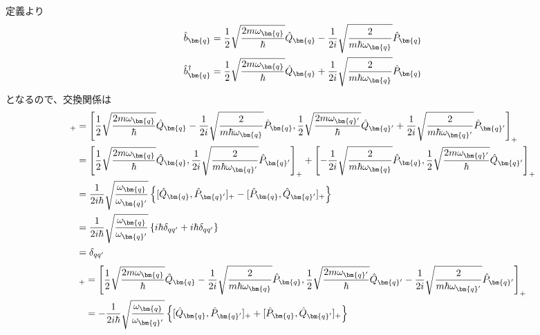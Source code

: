 \documentclass[dvipdfmx, 11pt, a4paper]{jsarticle}
\numberwithin{equation}{section}
\theoremstyle{definition}
\begin{document}
    \begin{derivationBox}
        定義より
        \begin{align}
            \hat{b}_{\bm{q}} &= \frac{1}{2}\sqrt{\frac{2m\omega_{\bm{q}}}{\hbar}} \hat{Q}_{\bm{q}} - \frac{1}{2i}\sqrt{\frac{2}{m\hbar\omega_{\bm{q}}}} \hat{P}_{\bm{q}} \notag \\
            \hat{b}_{\bm{q}}^\dagger &= \frac{1}{2}\sqrt{\frac{2m\omega_{\bm{q}}}{\hbar}} \hat{Q}_{\bm{q}} + \frac{1}{2i}\sqrt{\frac{2}{m\hbar\omega_{\bm{q}}}} \hat{P}_{\bm{q}}
        \end{align}
        となるので、交換関係は
        \begin{align}
            [\hat{b}_{\bm{q}},\hat{b}_{\bm{q}'}^\dagger]_+ &= \left[ \frac{1}{2}\sqrt{\frac{2m\omega_{\bm{q}}}{\hbar}} \hat{Q}_{\bm{q}} - \frac{1}{2i}\sqrt{\frac{2}{m\hbar\omega_{\bm{q}}}} \hat{P}_{\bm{q}}, \frac{1}{2}\sqrt{\frac{2m\omega_{\bm{q}'}}{\hbar}} \hat{Q}_{\bm{q}'} + \frac{1}{2i}\sqrt{\frac{2}{m\hbar\omega_{\bm{q}'}}} \hat{P}_{\bm{q}'} \right]_+ \notag \\
            &= \left[ \frac{1}{2}\sqrt{\frac{2m\omega_{\bm{q}}}{\hbar}} \hat{Q}_{\bm{q}} ,  \frac{1}{2i}\sqrt{\frac{2}{m\hbar\omega_{\bm{q}'}}} \hat{P}_{\bm{q}'} \right]_+ + \left[ - \frac{1}{2i}\sqrt{\frac{2}{m\hbar\omega_{\bm{q}}}} \hat{P}_{\bm{q}}, \frac{1}{2}\sqrt{\frac{2m\omega_{\bm{q}'}}{\hbar}} \hat{Q}_{\bm{q}'}\right]_+ \notag \\
            &= \frac{1}{2i\hbar}\sqrt{\frac{\omega_{\bm{q}}}{\omega_{\bm{q}'}}} \left\{ [\hat{Q}_{\bm{q}},\hat{P}_{\bm{q}'}]_+ - [\hat{P}_{\bm{q}}, \hat{Q}_{\bm{q}'}]_+ \right\} \notag \\
            &= \frac{1}{2i\hbar}\sqrt{\frac{\omega_{\bm{q}}}{\omega_{\bm{q}'}}} \left\{ i\hbar \delta_{qq'} + i\hbar \delta_{qq'} \right\}  \notag \\
            &= \delta_{qq'}
        \end{align}
        \begin{align}
            [\hat{b}_{\bm{q}},\hat{b}_{\bm{q}'}]_+ &= \left[ \frac{1}{2}\sqrt{\frac{2m\omega_{\bm{q}}}{\hbar}} \hat{Q}_{\bm{q}} - \frac{1}{2i}\sqrt{\frac{2}{m\hbar\omega_{\bm{q}}}} \hat{P}_{\bm{q}}, \frac{1}{2}\sqrt{\frac{2m\omega_{\bm{q}'}}{\hbar}} \hat{Q}_{\bm{q}'} - \frac{1}{2i}\sqrt{\frac{2}{m\hbar\omega_{\bm{q}'}}} \hat{P}_{\bm{q}'} \right]_+ \notag \\
            &= -\frac{1}{2i\hbar}\sqrt{\frac{\omega_{\bm{q}}}{\omega_{\bm{q}'}}} \left\{ [\hat{Q}_{\bm{q}},\hat{P}_{\bm{q}'}]_+ + [\hat{P}_{\bm{q}}, \hat{Q}_{\bm{q}'}]_+ \right\} \notag \\

\end{align}
\end{derivationBox}
\end{document}
